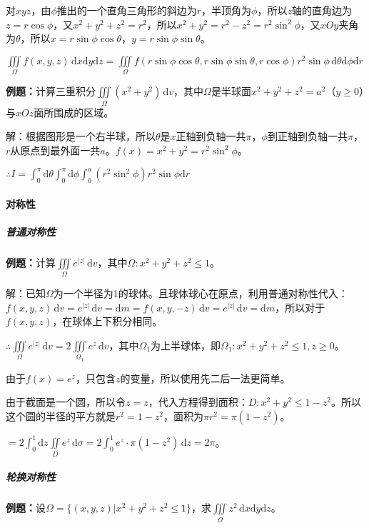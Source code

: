 \documentclass[UTF8, 12pt]{ctexart}
\begin{document}
对$xyz$，由$\phi$推出的一个直角三角形的斜边为$r$，半顶角为$\phi$，所以$z$轴的直角边为$z=r\cos\phi$，又$x^2+y^2+z^2=r^2$，所以$x^2+y^2=r^2-z^2=r^2\sin^2\phi$，又$xOy$夹角为$\theta$，所以$x=r\sin\phi\cos\theta$，$y=r\sin\phi\sin\theta$。

$\iiint\limits_\Omega f(x,y,z)\,\textrm{d}x\textrm{d}y\textrm{d}z=\iiint\limits_\Omega f(r\sin\phi\cos\theta,r\sin\phi\sin\theta,r\cos\phi)r^2\sin\phi\,\textrm{d}\theta\textrm{d}\phi\textrm{d}r$

\textbf{例题：}计算三重积分$\iiint\limits_\Omega(x^2+y^2)\,\textrm{d}v$，其中$\Omega$是半球面$x^2+y^2+z^2=a^2$（$y\geqslant0$）与$xOz$面所围成的区域。

解：根据图形是一个右半球，所以$\theta$是$x$正轴到负轴一共$\pi$，$\phi$到正轴到负轴一共$\pi$，$r$从原点到最外面一共$a$。$f(x)=x^2+y^2=r^2\sin^2\phi$。

$\therefore I=\int_0^\pi\textrm{d}\theta\int_0^\pi\textrm{d}\phi\int_0^a(r^2\sin^2\phi)r^2\sin\phi\textrm{d}r$

\paragraph{对称性} \leavevmode \medskip

\subparagraph{普通对称性} \leavevmode \medskip

\textbf{例题：}计算$\iiint\limits_\Omega e^{\vert z\vert}\,\textrm{d}v$，其中$\Omega:x^2+y^2+z^2\leqslant1$。

解：已知$\Omega$为一个半径为1的球体。且球体球心在原点，利用普通对称性代入：$f(x,y,z)\,\textrm{d}v=e^{\vert z\vert}\,\textrm{d}v=\textrm{d}m=f(x,y,-z)\,\textrm{d}v=e^{\vert z\vert}\,\textrm{d}v=\textrm{d}m$，所以对于$f(x,y,z)$，在球体上下积分相同。

$\therefore\iiint\limits_\Omega e^{\vert z\vert}\,\textrm{d}v=2\iiint\limits_{\Omega_1}e^z\,\textrm{d}v$，其中$\Omega_1$为上半球体，即$\Omega_1:x^2+y^2+z^2\leqslant1,z\geqslant0$。

由于$f(x)=e^z$，只包含$z$的变量，所以使用先二后一法更简单。

由于截面是一个圆，所以令$z=z$，代入方程得到面积：$D:x^2+y^2\leqslant1-z^2$。所以这个圆的半径的平方就是$r^2=1-z^2$，面积为$\pi r^2=\pi(1-z^2)$。

$=2\int_0^1\textrm{d}z\iint\limits_De^z\,\textrm{d}\sigma=2\int_0^1e^z\cdot\pi(1-z^2)\,\textrm{d}z=2\pi$。

\subparagraph{轮换对称性} \leavevmode \medskip

\textbf{例题：}设$\Omega=\{(x,y,z)|x^2+y^2+z^2\leqslant1\}$，求$\iiint\limits_\Omega z^2\,\textrm{d}x\textrm{d}y\textrm{d}z$。
\end{document}
